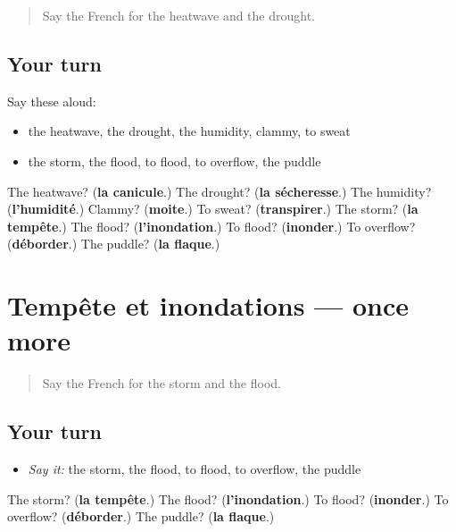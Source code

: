 \label{lesson:FR-R465-revision-464-465}



\begin{quote}
Say the French for the heatwave and the drought.
\end{quote}

\subsection*{Your turn}
Say these aloud:

\begin{itemize}
\raggedright
  \item the heatwave, the drought, the humidity, clammy, to sweat
  \item the storm, the flood, to flood, to overflow, the puddle
\end{itemize}

\begin{tcolorbox}[breakable,colback=teal!4,colframe=teal!35!black,title={Before you move on}]
The heatwave? (\textbf{la canicule}.) The drought? (\textbf{la sécheresse}.) The humidity? (\textbf{l'humidité}.) Clammy? (\textbf{moite}.) To sweat? (\textbf{transpirer}.) The storm? (\textbf{la tempête}.) The flood? (\textbf{l'inondation}.) To flood? (\textbf{inonder}.) To overflow? (\textbf{déborder}.) The puddle? (\textbf{la flaque}.)
\end{tcolorbox}
\section[(dialogue)]{Tempête et inondations — once more}

\label{lesson:FR-R465-revision-final-465}



\begin{quote}
Say the French for the storm and the flood.
\end{quote}

\subsection*{Your turn}
\begin{itemize}
\raggedright
  \item \emph{Say it:} the storm, the flood, to flood, to overflow, the puddle
\end{itemize}

\begin{tcolorbox}[breakable,colback=teal!4,colframe=teal!35!black,title={Before you move on}]
The storm? (\textbf{la tempête}.) The flood? (\textbf{l'inondation}.) To flood? (\textbf{inonder}.) To overflow? (\textbf{déborder}.) The puddle? (\textbf{la flaque}.)
\end{tcolorbox}
